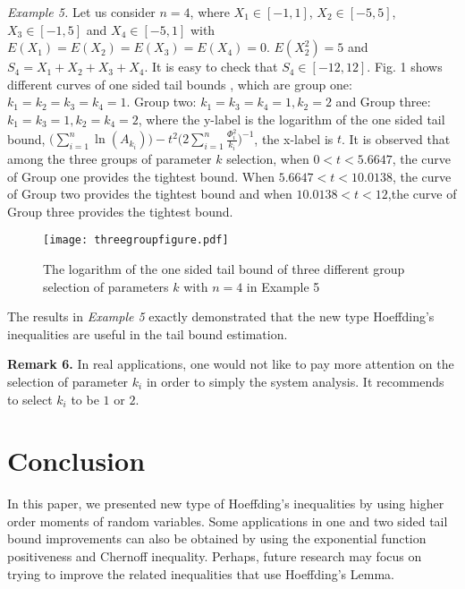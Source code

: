 \documentclass[journal]{IEEEtran}
\begin{document}
\emph{Example 5.} Let us consider $n=4$, where $X_1 \in [-1,1]$, $X_2 \in [-5,5]$,  $X_3 \in [-1,5]$ and $X_4 \in [-5,1]$ with $E(X_1)=E(X_2)=E(X_3)=E(X_4)=0$. $ E(X_2^2)=5$ and $S_4=X_1+X_2+X_3+X_4$. It is easy to check that $S_4 \in [-12,12]$.
Fig. 1 shows different curves of one sided tail bounds , which are group one: $k_1=k_2=k_3=k_4 =1$. Group two: $k_1=k_3=k_4 =1, k_2=2$ and Group three: $k_1=k_3=1, k_2=k_4=2$, where the y-label is the logarithm of the one sided tail bound, $\Big(\sum_{i=1}^n \ln(A_{k_i})\Big)-t^2\Big(2\sum_{i=1}^n \frac{\Phi_i^2}{k_i}\Big)^{-1}$, the x-label is $t$.  It is observed that among the three groups of parameter $k$ selection, when $0<t<5.6647$, the curve of Group one provides the tightest bound. When $5.6647<t<10.0138$,  the curve of Group two provides the tightest bound and when $10.0138<t<12$,the curve of Group three provides the tightest bound.

\begin{figure}[http]
\centering
\texttt{[image: threegroupfigure.pdf]}
 \caption{The logarithm of the one sided tail bound of three different group selection of parameters $k$ with $n=4$ in Example 5}
\label{fig:example 5}
\end{figure}






The results in \emph{Example 5} exactly demonstrated that the new type Hoeffding's inequalities are useful in the tail bound estimation.

\textbf{Remark 6.}
In real applications, one would not like to pay more attention on the selection of parameter $k_i$ in order to simply the system analysis. It recommends to select $k_i$ to be $ 1$ or $2$.

\section{Conclusion}

In this paper, we presented new type of Hoeffding's inequalities by using higher order moments of random variables. Some applications in one and two sided tail bound improvements can also be obtained by using the exponential function positiveness and Chernoff inequality. Perhaps, future research may focus on trying to improve the related inequalities that use Hoeffding's Lemma.
\end{document}
